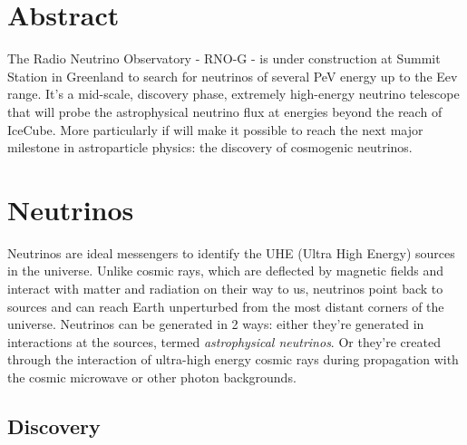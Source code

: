\documentclass[11pt,a4paper,faculty=we,language=en,doctype=report]{cls/ugent-doc}
\renewcommand{\ULthickness}{2pt} %
\begin{document}

\maketitle
\renewcommand{\ULthickness}{1pt}


{\hypersetup{hidelinks}\tableofcontents} %
\newpage


\chapter{Abstract}
The Radio Neutrino Observatory - RNO-G - is under construction at Summit Station in Greenland to search for neutrinos of several PeV energy up to the Eev range. It's a mid-scale, discovery phase, extremely high-energy neutrino telescope that will probe the astrophysical neutrino flux at energies beyond the reach of IceCube.
More particularly if will make it possible to reach the next major milestone in astroparticle physics: the discovery of cosmogenic neutrinos.

\chapter{Neutrinos}
Neutrinos are ideal messengers to identify the UHE (Ultra High Energy) sources in the universe. Unlike cosmic rays, which are deflected by magnetic fields and interact with matter and radiation on their way to us, neutrinos point back to sources and can reach Earth unperturbed from the most distant corners of the universe.
Neutrinos can be generated in 2 ways: either they're generated in interactions at the sources, termed \textit{astrophysical neutrinos}. Or they're created through the interaction of ultra-high energy cosmic rays during propagation with the cosmic microwave or other photon backgrounds. 
\section{Discovery}
\end{document}
